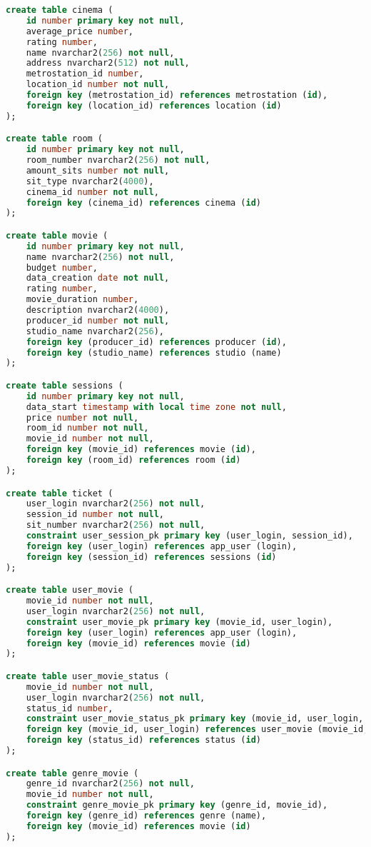 \documentclass[a4paper,16pt]{article}
\begin{document}
\begin{lstlisting}[language=SQL]
create table cinema (
    id number primary key not null,
    average_price number,
    rating number,
    name nvarchar2(256) not null,
    address nvarchar2(512) not null,
    metrostation_id number,
    location_id number not null, 
    foreign key (metrostation_id) references metrostation (id),
    foreign key (location_id) references location (id)
);

create table room (
    id number primary key not null,
    room_number nvarchar2(256) not null,
    amount_sits number not null,
    sit_type nvarchar2(4000),
    cinema_id number not null,
    foreign key (cinema_id) references cinema (id)
);

create table movie (
    id number primary key not null,
    name nvarchar2(256) not null,
    budget number,
    data_creation date not null,
    rating number,
    movie_duration number,
    description nvarchar2(4000),
    producer_id number not null,
    studio_name nvarchar2(256),
    foreign key (producer_id) references producer (id),
    foreign key (studio_name) references studio (name)
);

create table sessions (
    id number primary key not null,
    data_start timestamp with local time zone not null,
    price number not null,
    room_id number not null,
    movie_id number not null,
    foreign key (movie_id) references movie (id),
    foreign key (room_id) references room (id)
);

create table ticket (
    user_login nvarchar2(256) not null,
    session_id number not null,
    sit_number nvarchar2(256) not null,
    constraint user_session_pk primary key (user_login, session_id),
    foreign key (user_login) references app_user (login),
    foreign key (session_id) references sessions (id)
);

create table user_movie (
    movie_id number not null,
    user_login nvarchar2(256) not null,
    constraint user_movie_pk primary key (movie_id, user_login),
    foreign key (user_login) references app_user (login),
    foreign key (movie_id) references movie (id)
);

create table user_movie_status (
    movie_id number not null,
    user_login nvarchar2(256) not null,
    status_id number,
    constraint user_movie_status_pk primary key (movie_id, user_login, status_id),
    foreign key (movie_id, user_login) references user_movie (movie_id, user_login),
    foreign key (status_id) references status (id)
);

create table genre_movie (
    genre_id nvarchar2(256) not null,
    movie_id number not null,
    constraint genre_movie_pk primary key (genre_id, movie_id),
    foreign key (genre_id) references genre (name),
    foreign key (movie_id) references movie (id)
);


\end{lstlisting}
\end{document}
